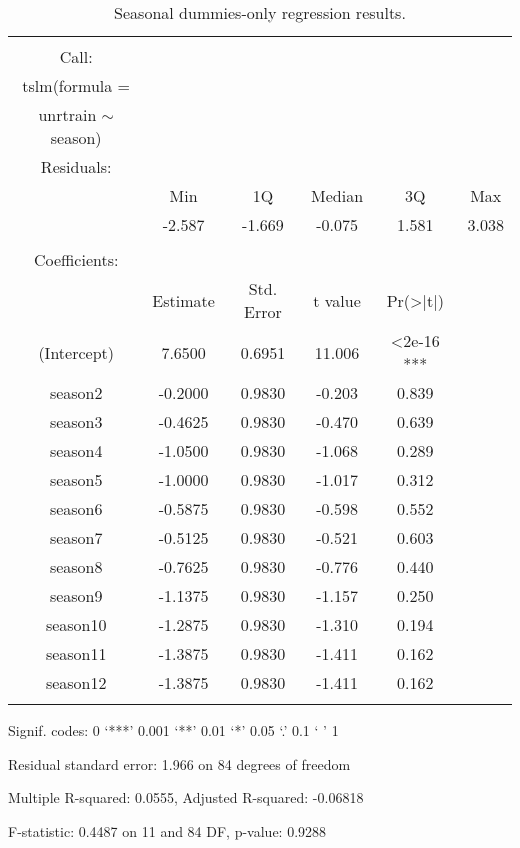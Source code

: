 \documentclass{article}
\begin{document}
\begin{table}[!htbp] \centering 
\begin{threeparttable}
  \caption{Seasonal dummies-only regression results.} 
  \label{} 
\begin{tabular}{@{\extracolsep{5pt}} cccccc} 
 \toprule
\\[-1.8ex]\hline 
\hline \\[-1.8ex] 
Call: \\
tslm(formula = \\
unrtrain $\sim$ season) \\
\midrule
Residuals: \\
 &  Min  &    1Q & Median  &    3Q   &  Max \\
& -2.587 & -1.669 & -0.075 &  1.581 &  3.038 \\
\\
Coefficients: \\
     &        Estimate & Std. Error & t value & Pr(>|t|)    \\
(Intercept) &   7.6500   &   0.6951 &  11.006  &  <2e-16 *** \\
season2    &   -0.2000  &    0.9830 &  -0.203  &   0.839     \\
season3   &    -0.4625  &    0.9830  & -0.470  &   0.639    \\
season4    &   -1.0500   &   0.9830 & -1.068  &   0.289    \\
season5    &   -1.0000  &    0.9830 &  -1.017  &   0.312    \\
season6   &    -0.5875  &    0.9830 &  -0.598   &  0.552    \\
season7   &    -0.5125  &    0.9830 &  -0.521  &   0.603    \\
season8   &    -0.7625  &    0.9830 &  -0.776  &   0.440   \\ 
season9    &   -1.1375  &    0.9830  & -1.157  &   0.250    \\
season10   &   -1.2875  &    0.9830 &  -1.310   &  0.194    \\
season11    &  -1.3875  &    0.9830  & -1.411   &  0.162    \\
season12  &    -1.3875   &   0.9830 &   -1.411  &   0.162    \\
\hline \\[-1.8ex] 
\bottomrule
 \end{tabular}
 \begin{tablenotes}
      \small
      \item Signif. codes:  0 ‘***’ 0.001 ‘**’ 0.01 ‘*’ 0.05 ‘.’ 0.1 ‘ ’ 1
\item Residual standard error: 1.966 on 84 degrees of freedom
\item Multiple R-squared:  0.0555,	Adjusted R-squared:  -0.06818 
\item F-statistic: 0.4487 on 11 and 84 DF,  p-value: 0.9288
\end{tablenotes}
  \end{threeparttable}
\end{table} 
\end{document}

